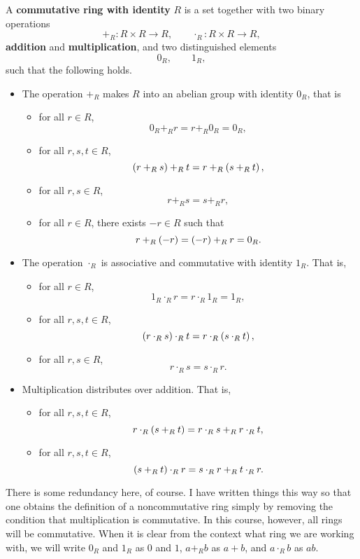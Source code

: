 \begin{definition}
A \textbf{commutative ring with identity} $ R $ is a set together with two binary operations
$$ +_R : R \times R \to R, \qquad \cdot_R : R \times R \to R, $$
\textbf{addition} and \textbf{multiplication}, and two distinguished elements
$$ 0_R, \qquad 1_R, $$
such that the following holds.
\begin{itemize}
\item The operation $ +_R $ makes $ R $ into an abelian group with identity $ 0_R $, that is
\begin{itemize}
\item for all $ r \in R $,
$$ 0_R +_R r = r +_R 0_R = 0_R, $$
\item for all $ r, s, t \in R $,
$$ \br{r +_R s} +_R t = r +_R \br{s +_R t}, $$
\item for all $ r, s \in R $,
$$ r +_R s = s +_R r, $$
\item for all $ r \in R $, there exists $ -r \in R $ such that
$$ r +_R \br{-r} = \br{-r} +_R r = 0_R. $$
\end{itemize}
\item The operation $ \cdot_R $ is associative and commutative with identity $ 1_R $. That is,
\begin{itemize}
\item for all $ r \in R $,
$$ 1_R \cdot_R r = r \cdot_R 1_R = 1_R, $$
\item for all $ r, s, t \in R $,
$$ \br{r \cdot_R s} \cdot_R t = r \cdot_R \br{s \cdot_R t}, $$
\item for all $ r, s \in R $,
$$ r \cdot_R s = s \cdot_R r. $$
\end{itemize}
\item Multiplication distributes over addition. That is,
\begin{itemize}
\item for all $ r, s, t \in R $,
$$ r \cdot_R \br{s +_R t} = r \cdot_R s +_R r \cdot_R t, $$
\item for all $ r, s, t \in R $,
$$ \br{s +_R t} \cdot_R r = s \cdot_R r +_R t \cdot_R r. $$
\end{itemize}
\end{itemize}
\end{definition}

There is some redundancy here, of course. I have written things this way so that one obtains the definition of a noncommutative ring simply by removing the condition that multiplication is commutative. In this course, however, all rings will be commutative. When it is clear from the context what ring we are working with, we will write $ 0_R $ and $ 1_R $ as $ 0 $ and $ 1 $, $ a +_R b $ as $ a + b $, and $ a \cdot_R b $ as $ ab $.

